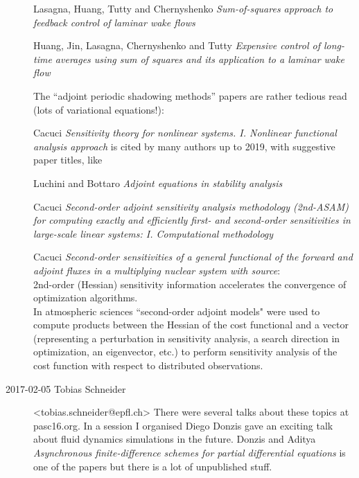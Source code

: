 \begin{description}
Lasagna, Huang, Tutty and Chernyshenko
{\em Sum-of-squares approach to feedback control of laminar wake flows}

Huang,  Jin,  Lasagna,  Chernyshenko and Tutty
{\em Expensive control of long-time averages using sum of squares and its
application to a laminar wake flow}


The ``adjoint periodic shadowing methods'' papers are rather tedious read (lots of
variational equations!):

Cacuci {\em Sensitivity theory for nonlinear systems. {I. Nonlinear}
functional analysis approach} is cited by many authors up to 2019, with suggestive
paper titles, like

Luchini and Bottaro {\em Adjoint equations in stability analysis}

Cacuci {\em Second-order adjoint sensitivity analysis methodology
(2nd-{ASAM}) for computing exactly and efficiently first- and second-order
sensitivities in large-scale linear systems: {I. Computationa}l methodology}

Cacuci {\em Second-order sensitivities of a general functional of
the forward and adjoint fluxes in a multiplying nuclear system with source}:
\\
2nd-order (Hessian) sensitivity information accelerates the
convergence of optimization algorithms.
\\
In atmospheric
sciences ``second-order adjoint
models" were used to compute products between the Hessian of the cost
functional and a vector (representing a perturbation in sensitivity analysis, a
search direction in optimization, an eigenvector, etc.) to perform sensitivity
analysis of the cost function with respect to distributed observations.

\item[2017-02-05 Tobias Schneider]  <tobias.schneider@epfl.ch>
There were several talks about these topics at
 {pasc16.org}. In a session I organised Diego
Donzis gave an exciting talk about fluid dynamics simulations in the
future. Donzis and Aditya
{\em Asynchronous finite-difference schemes for partial differential equations}
   is one of the papers but there is a lot of unpublished stuff.


\end{description}
